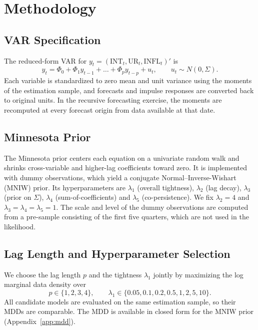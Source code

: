 \documentclass[11pt]{article}
\begin{document}
\section{Methodology}
\label{sec:method}

\subsection{VAR Specification}

The reduced-form VAR for $y_t = (\text{INT}_t, \text{UR}_t, \text{INFL}_t)'$ is
\begin{equation}
  y_t = \Phi_0 + \Phi_1 y_{t-1} + \dots + \Phi_p y_{t-p} + u_t, \qquad u_t \sim N(0, \Sigma).
\end{equation}
Each variable is standardized to zero mean and unit variance using the moments of the estimation sample, and forecasts and impulse responses are converted back to original units. In the recursive forecasting exercise, the moments are recomputed at every forecast origin from data available at that date.

\subsection{Minnesota Prior}

The Minnesota prior centers each equation on a univariate random walk and shrinks cross-variable and higher-lag coefficients toward zero. It is implemented with dummy observations, which yield a conjugate Normal--Inverse-Wishart (MNIW) prior. Its hyperparameters are $\lambda_1$ (overall tightness), $\lambda_2$ (lag decay), $\lambda_3$ (prior on $\Sigma$), $\lambda_4$ (sum-of-coefficients) and $\lambda_5$ (co-persistence). We fix $\lambda_2 = 4$ and $\lambda_3 = \lambda_4 = \lambda_5 = 1$. The scale and level of the dummy observations are computed from a pre-sample consisting of the first five quarters, which are not used in the likelihood.

\subsection{Lag Length and Hyperparameter Selection}

We choose the lag length $p$ and the tightness $\lambda_1$ jointly by maximizing the log marginal data density over
\[
  p \in \{1, 2, 3, 4\}, \qquad \lambda_1 \in \{0.05, 0.1, 0.2, 0.5, 1, 2, 5, 10\}.
\]
All candidate models are evaluated on the same estimation sample, so their MDDs are comparable. The MDD is available in closed form for the MNIW prior (Appendix~\ref{app:mdd}).
\end{document}
